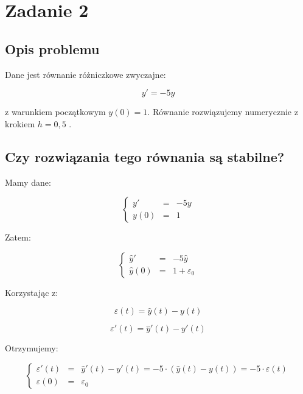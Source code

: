 \documentclass{article}
\begin{document}
	\newpage


	\section*{Zadanie 2}
	
	\subsection*{Opis problemu}

	Dane jest równanie różniczkowe zwyczajne:

	\begin{equation}
		y' = -5y
	\end{equation}

	z warunkiem początkowym $y(0) = 1$. Równanie rozwiązujemy numerycznie z krokiem $h = 0,5$ . 

	\subsection*{Czy rozwiązania tego równania są stabilne?}

	Mamy dane:

	\begin{equation}
		\left\{\begin{array}{rcl}
			y' &=& -5y \\
			y(0) &=& 1
			\end{array} \right.
	\end{equation}

	Zatem:

	\begin{equation}
		\left\{\begin{array}{rcl}
			\hat{y}' &=& -5\hat{y} \\
			\hat{y}(0) &=& 1+\varepsilon_0
			\end{array} \right.
	\end{equation}

	Korzystając z:

	\begin{equation}
		\varepsilon (t) = \hat{y}(t) - y(t)
	\end{equation}

	\begin{equation}
		\varepsilon ' (t) = \hat{y}'(t) - y'(t)
	\end{equation}

	Otrzymujemy:

	\begin{equation}
		\left\{\begin{array}{rcl}
			\varepsilon ' (t) &=& \hat{y}'(t) - y'(t) = -5 \cdot (\hat{y}(t) - y(t)) = -5 \cdot \varepsilon (t) \\
			\varepsilon (0) &=& \varepsilon_0
			\end{array} \right.
	\end{equation}
\end{document}
